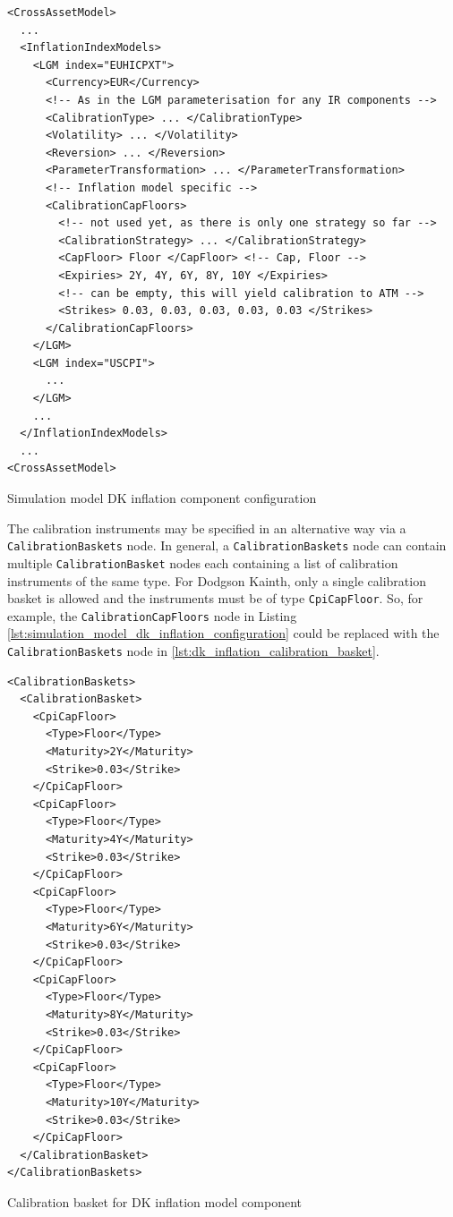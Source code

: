 \documentclass[12pt, a4paper]{article}
\begin{document}
{\begin{listing}[H]
\begin{verbatim}
<CrossAssetModel>	
  ...
  <InflationIndexModels>
    <LGM index="EUHICPXT">
      <Currency>EUR</Currency>
      <!-- As in the LGM parameterisation for any IR components -->
      <CalibrationType> ... </CalibrationType>
      <Volatility> ... </Volatility>
      <Reversion> ... </Reversion> 
      <ParameterTransformation> ... </ParameterTransformation>
      <!-- Inflation model specific -->
      <CalibrationCapFloors>
        <!-- not used yet, as there is only one strategy so far -->
        <CalibrationStrategy> ... </CalibrationStrategy> 
        <CapFloor> Floor </CapFloor> <!-- Cap, Floor -->
        <Expiries> 2Y, 4Y, 6Y, 8Y, 10Y </Expiries>
        <!-- can be empty, this will yield calibration to ATM -->
        <Strikes> 0.03, 0.03, 0.03, 0.03, 0.03 </Strikes> 
      </CalibrationCapFloors>
    </LGM>
    <LGM index="USCPI">
      ...
    </LGM>
    ...
  </InflationIndexModels>
  ...
<CrossAssetModel>	
\end{verbatim}
\caption{Simulation model DK inflation component configuration}
\label{lst:simulation_model_dk_inflation_configuration}
\end{listing}

The calibration instruments may be specified in an alternative way via a \lstinline!CalibrationBaskets! node. In general, a \lstinline!CalibrationBaskets! node 
can contain multiple \lstinline!CalibrationBasket! nodes each containing a list of calibration instruments of the same type. For Dodgson Kainth, only a single 
calibration basket is allowed and the instruments must be of type \lstinline!CpiCapFloor!. So, for example, the \lstinline!CalibrationCapFloors! node in 
Listing \ref{lst:simulation_model_dk_inflation_configuration} could be replaced with the \lstinline!CalibrationBaskets! node in \ref{lst:dk_inflation_calibration_basket}.

\begin{listing}[H]
\begin{verbatim}
<CalibrationBaskets>
  <CalibrationBasket>
    <CpiCapFloor>
      <Type>Floor</Type>
      <Maturity>2Y</Maturity>
      <Strike>0.03</Strike>
    </CpiCapFloor>
    <CpiCapFloor>
      <Type>Floor</Type>
      <Maturity>4Y</Maturity>
      <Strike>0.03</Strike>
    </CpiCapFloor>
    <CpiCapFloor>
      <Type>Floor</Type>
      <Maturity>6Y</Maturity>
      <Strike>0.03</Strike>
    </CpiCapFloor>
    <CpiCapFloor>
      <Type>Floor</Type>
      <Maturity>8Y</Maturity>
      <Strike>0.03</Strike>
    </CpiCapFloor>
    <CpiCapFloor>
      <Type>Floor</Type>
      <Maturity>10Y</Maturity>
      <Strike>0.03</Strike>
    </CpiCapFloor>
  </CalibrationBasket>
</CalibrationBaskets>
\end{verbatim}
\caption{Calibration basket for DK inflation model component}
\label{lst:dk_inflation_calibration_basket}
\end{listing}

}
\end{document}
